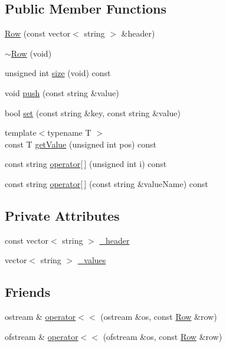 \subsection*{Public Member Functions}
\begin{DoxyCompactItemize}
\item 
\mbox{\hyperlink{class_row_afc5afcd4b8560ddd3b7372df2bc063a8}{Row}} (const vector$<$ string $>$ \&header)
\item 
\mbox{\hyperlink{class_row_a671be9f718722eccb2d3121f1579733e}{$\sim$\+Row}} (void)
\item 
unsigned int \mbox{\hyperlink{class_row_ac3dce6d0bd64e944a932a5a26c3ebcef}{size}} (void) const
\item 
void \mbox{\hyperlink{class_row_ac18926c6dc8fdfb37894009a8c80fdb1}{push}} (const string \&value)
\item 
bool \mbox{\hyperlink{class_row_a74ab22cc8f79c7a1c87da8fefae0d834}{set}} (const string \&key, const string \&value)
\item 
{\footnotesize template$<$typename T $>$ }\\const T \mbox{\hyperlink{class_row_a06931bff452df5a451da2268423bb6ea}{get\+Value}} (unsigned int pos) const
\item 
const string \mbox{\hyperlink{class_row_a705ecee70126716fbe16337e4a2b8764}{operator\mbox{[}$\,$\mbox{]}}} (unsigned int i) const
\item 
const string \mbox{\hyperlink{class_row_a42f23dd69d591da253b7428647f16ff8}{operator\mbox{[}$\,$\mbox{]}}} (const string \&value\+Name) const
\end{DoxyCompactItemize}
\subsection*{Private Attributes}
\begin{DoxyCompactItemize}
\item 
const vector$<$ string $>$ \mbox{\hyperlink{class_row_a98603a15923aa97e15198393ef3080c0}{\+\_\+header}}
\item 
vector$<$ string $>$ \mbox{\hyperlink{class_row_ab064db33f941055c8d99a6f47eae733c}{\+\_\+values}}
\end{DoxyCompactItemize}
\subsection*{Friends}
\begin{DoxyCompactItemize}
\item 
ostream \& \mbox{\hyperlink{class_row_a8962fdc6373687757234a811e803a1da}{operator$<$$<$}} (ostream \&os, const \mbox{\hyperlink{class_row}{Row}} \&row)
\item 
ofstream \& \mbox{\hyperlink{class_row_ad4e8b6c4b0238a50bde8e99ec8a0dcb0}{operator$<$$<$}} (ofstream \&os, const \mbox{\hyperlink{class_row}{Row}} \&row)
\end{DoxyCompactItemize}


